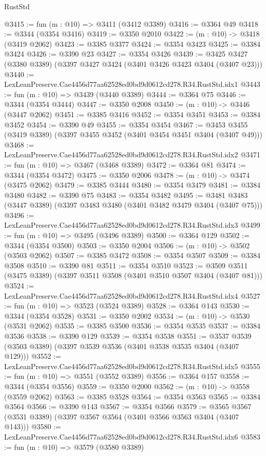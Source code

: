 \begin{lexlean}{RustStd}
\begin{coremodule}
@3415 := fun (m : @10) => @3411 (@3412 @3389)
@3416 := @3364 @49
@3418 := @3344 (@3354 @3416)
@3419 := @3350 @2010
@3422 := (m : @10) -> @3418 (@3419 @2062)
@3423 := @3385 @3377
@3424 := @3354 @3423
@3425 := @3384 @3424
@3426 := @3390 @23
@3427 := @3354 @3426
@3439 := @3425 @3427 (@3380 @3389) (@3397 @3427 @3424 (@3401 @3426 @3423 @3404 (@3407 @23)))
@3440 := LexLeanPreserve.Cae4456d77aa62528ed0bd9d0612cd278.R34.RustStd.idx1
@3443 := fun (m : @10) => @3439 (@3440 @3389)
@3444 := @3364 @75
@3446 := @3344 (@3354 @3444)
@3447 := @3350 @2008
@3450 := (m : @10) -> @3446 (@3447 @2062)
@3451 := @3385 @3416
@3452 := @3354 @3451
@3453 := @3384 @3452
@3454 := @3390 @49
@3455 := @3354 @3454
@3467 := @3453 @3455 (@3419 @3389) (@3397 @3455 @3452 (@3401 @3454 @3451 @3404 (@3407 @49)))
@3468 := LexLeanPreserve.Cae4456d77aa62528ed0bd9d0612cd278.R34.RustStd.idx2
@3471 := fun (m : @10) => @3467 (@3468 @3389)
@3472 := @3364 @81
@3474 := @3344 (@3354 @3472)
@3475 := @3350 @2006
@3478 := (m : @10) -> @3474 (@3475 @2062)
@3479 := @3385 @3444
@3480 := @3354 @3479
@3481 := @3384 @3480
@3482 := @3390 @75
@3483 := @3354 @3482
@3495 := @3481 @3483 (@3447 @3389) (@3397 @3483 @3480 (@3401 @3482 @3479 @3404 (@3407 @75)))
@3496 := LexLeanPreserve.Cae4456d77aa62528ed0bd9d0612cd278.R34.RustStd.idx3
@3499 := fun (m : @10) => @3495 (@3496 @3389)
@3500 := @3364 @129
@3502 := @3344 (@3354 @3500)
@3503 := @3350 @2004
@3506 := (m : @10) -> @3502 (@3503 @2062)
@3507 := @3385 @3472
@3508 := @3354 @3507
@3509 := @3384 @3508
@3510 := @3390 @81
@3511 := @3354 @3510
@3523 := @3509 @3511 (@3475 @3389) (@3397 @3511 @3508 (@3401 @3510 @3507 @3404 (@3407 @81)))
@3524 := LexLeanPreserve.Cae4456d77aa62528ed0bd9d0612cd278.R34.RustStd.idx4
@3527 := fun (m : @10) => @3523 (@3524 @3389)
@3528 := @3364 @143
@3530 := @3344 (@3354 @3528)
@3531 := @3350 @2002
@3534 := (m : @10) -> @3530 (@3531 @2062)
@3535 := @3385 @3500
@3536 := @3354 @3535
@3537 := @3384 @3536
@3538 := @3390 @129
@3539 := @3354 @3538
@3551 := @3537 @3539 (@3503 @3389) (@3397 @3539 @3536 (@3401 @3538 @3535 @3404 (@3407 @129)))
@3552 := LexLeanPreserve.Cae4456d77aa62528ed0bd9d0612cd278.R34.RustStd.idx5
@3555 := fun (m : @10) => @3551 (@3552 @3389)
@3556 := @3364 @157
@3558 := @3344 (@3354 @3556)
@3559 := @3350 @2000
@3562 := (m : @10) -> @3558 (@3559 @2062)
@3563 := @3385 @3528
@3564 := @3354 @3563
@3565 := @3384 @3564
@3566 := @3390 @143
@3567 := @3354 @3566
@3579 := @3565 @3567 (@3531 @3389) (@3397 @3567 @3564 (@3401 @3566 @3563 @3404 (@3407 @143)))
@3580 := LexLeanPreserve.Cae4456d77aa62528ed0bd9d0612cd278.R34.RustStd.idx6
@3583 := fun (m : @10) => @3579 (@3580 @3389)

\end{coremodule}
\end{lexlean}

